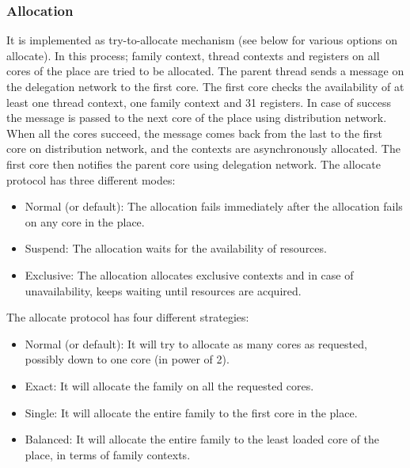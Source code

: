 \documentclass{article}
\begin{document}
\subsubsection*{Allocation}\label{sn:allocation_families}

It is implemented as try-to-allocate mechanism (see below for various options
on allocate). In this process; family context, thread contexts and registers on
all cores of the place are tried to be allocated. The parent thread sends a
message on the delegation network to the first core. The first core checks
the availability of at least one thread context, one family context and 31
registers. In case of success the message is passed to the next core of the
place using distribution network. When all the cores succeed, the message comes
back from the last to the first core on distribution network, and the contexts
are asynchronously allocated. The first core then notifies the parent core
using delegation network. The allocate protocol has three different modes:

\begin{itemize}

\item Normal (or default): The allocation fails immediately after the
    allocation fails on any core in the place.

\item Suspend: The allocation waits for the availability of resources.

\item Exclusive: The allocation allocates exclusive contexts and in case of
    unavailability, keeps waiting until resources are acquired.

\end{itemize}

The allocate protocol has four different strategies:

\begin{itemize}

\item Normal (or default): It will try to allocate as many cores as requested,
    possibly down to one core (in power of 2).

\item Exact: It will allocate the family on all the requested cores.

\item Single: It will allocate the entire family to the first core in the
    place.

\item Balanced: It will allocate the entire family to the least loaded core of
    the place, in terms of family contexts.

\end{itemize}
\end{document}
